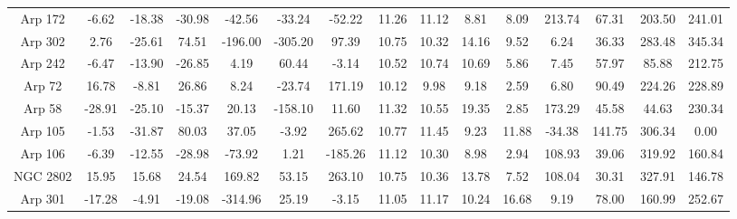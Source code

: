 \begin{table}
{\begin{tabular}{|c|c|c|c|c|c|c|c|c|c|c|c|c|c|c|}
      Arp 172 &    -6.62 &   -18.38 &   -30.98 &               -42.56 &               -33.24 &               -52.22 &                          11.26 &                          11.12 &          8.81 &          8.09 &      213.74 &       67.31 &        203.50 &        241.01 \\
      Arp 302 &     2.76 &   -25.61 &    74.51 &              -196.00 &              -305.20 &                97.39 &                          10.75 &                          10.32 &         14.16 &          9.52 &        6.24 &       36.33 &        283.48 &        345.34 \\
      Arp 242 &    -6.47 &   -13.90 &   -26.85 &                 4.19 &                60.44 &                -3.14 &                          10.52 &                          10.74 &         10.69 &          5.86 &        7.45 &       57.97 &         85.88 &        212.75 \\
       Arp 72 &    16.78 &    -8.81 &    26.86 &                 8.24 &               -23.74 &               171.19 &                          10.12 &                           9.98 &          9.18 &          2.59 &        6.80 &       90.49 &        224.26 &        228.89 \\
       Arp 58 &   -28.91 &   -25.10 &   -15.37 &                20.13 &              -158.10 &                11.60 &                          11.32 &                          10.55 &         19.35 &          2.85 &      173.29 &       45.58 &         44.63 &        230.34 \\
      Arp 105 &    -1.53 &   -31.87 &    80.03 &                37.05 &                -3.92 &               265.62 &                          10.77 &                          11.45 &          9.23 &         11.88 &      -34.38 &      141.75 &        306.34 &          0.00 \\
      Arp 106 &    -6.39 &   -12.55 &   -28.98 &               -73.92 &                 1.21 &              -185.26 &                          11.12 &                          10.30 &          8.98 &          2.94 &      108.93 &       39.06 &        319.92 &        160.84 \\
     NGC 2802 &    15.95 &    15.68 &    24.54 &               169.82 &                53.15 &               263.10 &                          10.75 &                          10.36 &         13.78 &          7.52 &      108.04 &       30.31 &        327.91 &        146.78 \\
      Arp 301 &   -17.28 &    -4.91 &   -19.08 &              -314.96 &                25.19 &                -3.15 &                          11.05 &                          11.17 &         10.24 &         16.68 &        9.19 &       78.00 &        160.99 &        252.67 \\

\end{tabular}}
\end{table}
